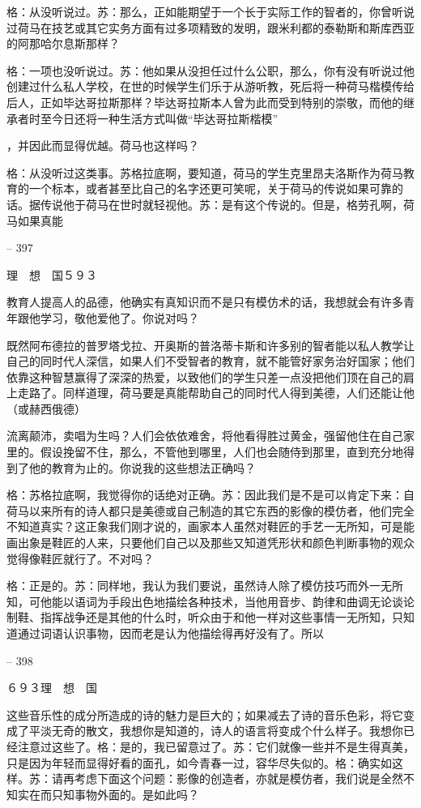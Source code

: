 \documentclass[11pt,oneside]{book}
\begin{document}
\begin{common-format}
    格：从没听说过。苏：那么，正如能期望于一个长于实际工作的智者的，你曾听说过荷马在技艺或其它实务方面有过多项精致的发明，跟米利都的泰勒斯和斯库西亚的阿那哈尔息斯那样？

    格：一项也没听说过。苏：他如果从没担任过什么公职，那么，你有没有听说过他创建过什么私人学校，在世的时候学生们乐于从游听教，死后将一种荷马楷模传给后人，正如毕达哥拉斯那样？毕达哥拉斯本人曾为此而受到特别的崇敬，而他的继承者时至今日还将一种生活方式叫做“毕达哥拉斯楷模”

    ，并因此而显得优越。荷马也这样吗？

    格：从没听过这类事。苏格拉底啊，要知道，荷马的学生克里昂夫洛斯作为荷马教育的一个标本，或者甚至比自己的名字还更可笑呢，关于荷马的传说如果可靠的话。据传说他于荷马在世时就轻视他。苏：是有这个传说的。但是，格劳孔啊，荷马如果真能

    

-- 397

    理　想　国５９３

    教育人提高人的品德，他确实有真知识而不是只有模仿术的话，我想就会有许多青年跟他学习，敬他爱他了。你说对吗？

    既然阿布德拉的普罗塔戈拉、开奥斯的普洛蒂卡斯和许多别的智者能以私人教学让自己的同时代人深信，如果人们不受智者的教育，就不能管好家务治好国家；他们依靠这种智慧赢得了深深的热爱，以致他们的学生只差一点没把他们顶在自己的肩上走路了。同样道理，荷马要是真能帮助自己的同时代人得到美德，人们还能让他（或赫西俄德）

    流离颠沛，卖唱为生吗？人们会依依难舍，将他看得胜过黄金，强留他住在自己家里的。假设挽留不住，那么，不管他到哪里，人们也会随侍到那里，直到充分地得到了他的教育为止的。你说我的这些想法正确吗？

    格：苏格拉底啊，我觉得你的话绝对正确。苏：因此我们是不是可以肯定下来：自荷马以来所有的诗人都只是美德或自己制造的其它东西的影像的模仿者，他们完全不知道真实？这正象我们刚才说的，画家本人虽然对鞋匠的手艺一无所知，可是能画出象是鞋匠的人来，只要他们自己以及那些又知道凭形状和颜色判断事物的观众觉得像鞋匠就行了。不对吗？

    格：正是的。苏：同样地，我认为我们要说，虽然诗人除了模仿技巧而外一无所知，可他能以语词为手段出色地描绘各种技术，当他用音步、韵律和曲调无论谈论制鞋、指挥战争还是其他的什么时，听众由于和他一样对这些事情一无所知，只知道通过词语认识事物，因而老是认为他描绘得再好没有了。所以

    

-- 398

    ６９３理　想　国

    这些音乐性的成分所造成的诗的魅力是巨大的；如果减去了诗的音乐色彩，将它变成了平淡无奇的散文，我想你是知道的，诗人的语言将变成个什么样子。我想你已经注意过这些了。格：是的，我已留意过了。苏：它们就像一些并不是生得真美，只是因为年轻而显得好看的面孔，如今青春一过，容华尽失似的。格：确实如这样。苏：请再考虑下面这个问题：影像的创造者，亦就是模仿者，我们说是全然不知实在而只知事物外面的。是如此吗？


\end{common-format}
\end{document}
